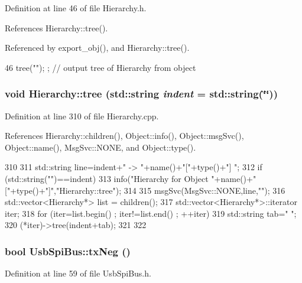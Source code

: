 Definition at line 46 of file Hierarchy.h.

References Hierarchy::tree().

Referenced by export\_\-obj(), and Hierarchy::tree().


\begin{DoxyCode}
46 { tree(""); };                     // output tree of Hierarchy from object
\end{DoxyCode}
\hypertarget{classHierarchy_a76e914b9a677a22a82deb74d892bf261}{
\subsubsection[{tree}]{\setlength{\rightskip}{0pt plus 5cm}void Hierarchy::tree (std::string {\em indent} = {\ttfamily std::string(\char`\"{}\char`\"{})})}}
\label{classHierarchy_a76e914b9a677a22a82deb74d892bf261}


Definition at line 310 of file Hierarchy.cpp.

References Hierarchy::children(), Object::info(), Object::msgSvc(), Object::name(), MsgSvc::NONE, and Object::type().


\begin{DoxyCode}
310                                     {
311   std::string line=indent+" -> "+name()+"["+type()+"] ";
312   if (std::string("")==indent){
313     info("Hierarchy for Object "+name()+"["+type()+"]","Hierarchy::tree");
314   }
315   msgSvc(MsgSvc::NONE,line,"");
316   std::vector<Hierarchy*> list = children();
317   std::vector<Hierarchy*>::iterator iter;
318   for (iter=list.begin() ; iter!=list.end() ; ++iter){
319     std::string tab="  ";
320     (*iter)->tree(indent+tab);
321   }
322 }
\end{DoxyCode}
\hypertarget{classUsbSpiBus_a08605d71903fc384ed119842833485f1}{
\subsubsection[{txNeg}]{\setlength{\rightskip}{0pt plus 5cm}bool UsbSpiBus::txNeg ()}}
\label{classUsbSpiBus_a08605d71903fc384ed119842833485f1}


Definition at line 59 of file UsbSpiBus.h.

